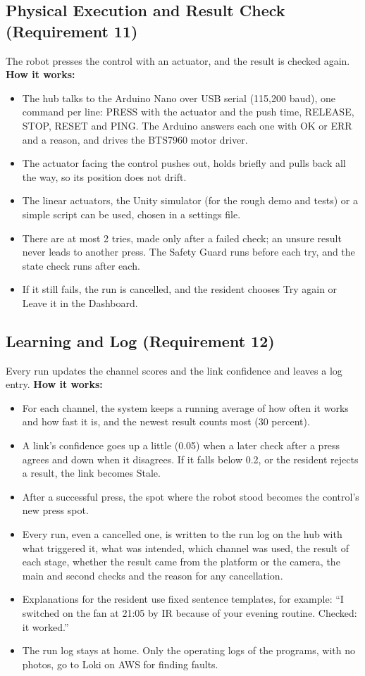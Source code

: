 \documentclass[conference]{IEEEtran}
\begin{document}
\subsection{Physical Execution and Result Check (Requirement 11)}
The robot presses the control with an actuator, and the result is checked again.
\textbf{How it works:}
\begin{itemize}
\item The hub talks to the Arduino Nano over USB serial (115,200 baud), one command per line: PRESS with the actuator and the push time, RELEASE, STOP, RESET and PING. The Arduino answers each one with OK or ERR and a reason, and drives the BTS7960 motor driver.
\item The actuator facing the control pushes out, holds briefly and pulls back all the way, so its position does not drift.
\item The linear actuators, the Unity simulator (for the rough demo and tests) or a simple script can be used, chosen in a settings file.
\item There are at most 2 tries, made only after a failed check; an unsure result never leads to another press. The Safety Guard runs before each try, and the state check runs after each.
\item If it still fails, the run is cancelled, and the resident chooses Try again or Leave it in the Dashboard.
\end{itemize}

\subsection{Learning and Log (Requirement 12)}
Every run updates the channel scores and the link confidence and leaves a log entry.
\textbf{How it works:}
\begin{itemize}
\item For each channel, the system keeps a running average of how often it works and how fast it is, and the newest result counts most (30 percent).
\item A link's confidence goes up a little (0.05) when a later check after a press agrees and down when it disagrees. If it falls below 0.2, or the resident rejects a result, the link becomes Stale.
\item After a successful press, the spot where the robot stood becomes the control's new press spot.
\item Every run, even a cancelled one, is written to the run log on the hub with what triggered it, what was intended, which channel was used, the result of each stage, whether the result came from the platform or the camera, the main and second checks and the reason for any cancellation.
\item Explanations for the resident use fixed sentence templates, for example: ``I switched on the fan at 21:05 by IR because of your evening routine. Checked: it worked.''
\item The run log stays at home. Only the operating logs of the programs, with no photos, go to Loki on AWS for finding faults.
\end{itemize}
\end{document}
